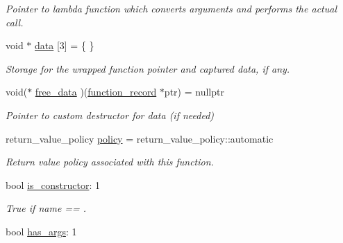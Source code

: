 \begin{DoxyCompactItemize}
\begin{DoxyCompactList}\small\item\em Pointer to lambda function which converts arguments and performs the actual call. \end{DoxyCompactList}\item 
void $\ast$ \hyperlink{structfunction__record_ada09f0077964b216ba0bf9c12cb6c25f}{data} \mbox{[}3\mbox{]} = \{ \}\hypertarget{structfunction__record_ada09f0077964b216ba0bf9c12cb6c25f}{}\label{structfunction__record_ada09f0077964b216ba0bf9c12cb6c25f}

\begin{DoxyCompactList}\small\item\em Storage for the wrapped function pointer and captured data, if any. \end{DoxyCompactList}\item 
void($\ast$ \hyperlink{structfunction__record_aa3019482c3aba125c05edf641d557576}{free\+\_\+data} )(\hyperlink{structfunction__record}{function\+\_\+record} $\ast$ptr) = nullptr\hypertarget{structfunction__record_aa3019482c3aba125c05edf641d557576}{}\label{structfunction__record_aa3019482c3aba125c05edf641d557576}

\begin{DoxyCompactList}\small\item\em Pointer to custom destructor for \textquotesingle{}data\textquotesingle{} (if needed) \end{DoxyCompactList}\item 
return\+\_\+value\+\_\+policy \hyperlink{structfunction__record_a27926b7355bd89048ff5da97758b5282}{policy} = return\+\_\+value\+\_\+policy\+::automatic\hypertarget{structfunction__record_a27926b7355bd89048ff5da97758b5282}{}\label{structfunction__record_a27926b7355bd89048ff5da97758b5282}

\begin{DoxyCompactList}\small\item\em Return value policy associated with this function. \end{DoxyCompactList}\item 
bool \hyperlink{structfunction__record_aa014e3469d353ed93ffb67d626879a29}{is\+\_\+constructor}\+: 1\hypertarget{structfunction__record_aa014e3469d353ed93ffb67d626879a29}{}\label{structfunction__record_aa014e3469d353ed93ffb67d626879a29}

\begin{DoxyCompactList}\small\item\em True if name == \textquotesingle{}. \end{DoxyCompactList}\item 
bool \hyperlink{structfunction__record_af05b5fc3d6d3b5bcec45bbd1c3e75f15}{has\+\_\+args}\+: 1\hypertarget{structfunction__record_af05b5fc3d6d3b5bcec45bbd1c3e75f15}{}\label{structfunction__record_af05b5fc3d6d3b5bcec45bbd1c3e75f15}


\end{DoxyCompactItemize}
